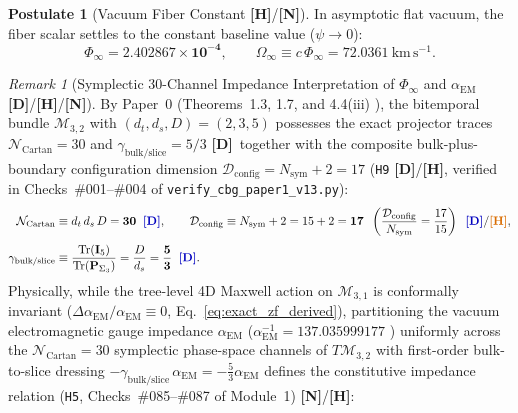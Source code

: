 \documentclass[11pt,a4paper]{article}
\newcommand{\catD}{\textbf{\textcolor{blue!75!black}{[D]}}}
\newcommand{\catH}{\textbf{\textcolor{orange!85!black}{[H]}}}
\newcommand{\catN}{\textbf{\textcolor{teal!75!black}{[N]}}}
\theoremstyle{definition}
\newtheorem{postulate}[theorem]{Postulate}
\theoremstyle{remark}
\newtheorem{remark}[theorem]{Remark}
\begin{document}
\begin{postulate}[Vacuum Fiber Constant \catH/\catN]
\label{post:phiinf}
\label{post:vacuum_constant}
In asymptotic flat vacuum, the fiber scalar settles to the constant baseline value ($\psi \to 0$):
\begin{equation}
  \Phi_\infty = \mathbf{2.402867 \times 10^{-4}}, \qquad
  \Omega_\infty \equiv c\,\Phi_\infty = \mathbf{72.0361\ \mathrm{km\,s^{-1}}} .
  \label{eq:phi_inf_dressed}
\end{equation}
\end{postulate}

\begin{remark}[Symplectic 30-Channel Impedance Interpretation of $\Phi_\infty$ and $\alpha_{\text{EM}}$ \catD/\catH/\catN]
\label{obs:phi_inf_relation}
By Paper~0 (Theorems~1.3, 1.7, and 4.4(iii) \cite{JV_Paper0}), the bitemporal bundle $\mathcal{M}_{3,2}$ with $(d_t, d_s, D) = (2, 3, 5)$ possesses the exact projector traces $\mathcal{N}_{\text{Cartan}} = 30$ and $\gamma_{\text{bulk/slice}} = 5/3$ \catD\ together with the composite bulk-plus-boundary configuration dimension $\mathcal{D}_{\text{config}} = N_{\text{sym}} + 2 = 17$ (\texttt{H9} \catD/\catH, verified in Checks~\#001--\#004 of \texttt{verify\_cbg\_paper1\_v13.py}):
\begin{equation}
\begin{aligned}
  \mathcal{N}_{\text{Cartan}} &\equiv d_t\,d_s\,D = \mathbf{30} \;\;\catD, \qquad
  \mathcal{D}_{\text{config}} \equiv N_{\text{sym}} + 2 = 15 + 2 = \mathbf{17} \;\;\left(\frac{\mathcal{D}_{\text{config}}}{N_{\text{sym}}} = \frac{17}{15}\right) \;\;\catD/\catH, \\[3pt]
  \gamma_{\text{bulk/slice}} &\equiv \frac{\text{Tr}(\mathbf{I}_5)}{\text{Tr}(\mathbf{P}_{\Sigma_3})} = \frac{D}{d_s} = \frac{\mathbf{5}}{\mathbf{3}} \;\;\catD.
\end{aligned}
\end{equation}
Physically, while the tree-level 4D Maxwell action on $\mathcal{M}_{3,1}$ is conformally invariant ($\Delta\alpha_{\text{EM}}/\alpha_{\text{EM}} \equiv 0$, Eq.~\ref{eq:exact_zf_derived}), partitioning the vacuum electromagnetic gauge impedance $\alpha_{\text{EM}}$ ($\alpha_{\text{EM}}^{-1} = 137.035999177$ \cite{CODATA2022}) uniformly across the $\mathcal{N}_{\text{Cartan}} = 30$ symplectic phase-space channels of $T\mathcal{M}_{3,2}$ with first-order bulk-to-slice dressing $-\gamma_{\text{bulk/slice}}\,\alpha_{\text{EM}} = -\frac{5}{3}\alpha_{\text{EM}}$ defines the constitutive impedance relation (\texttt{H5}, Checks~\#085--\#087 of Module~1) \catN/\catH:

\end{remark}
\end{document}
